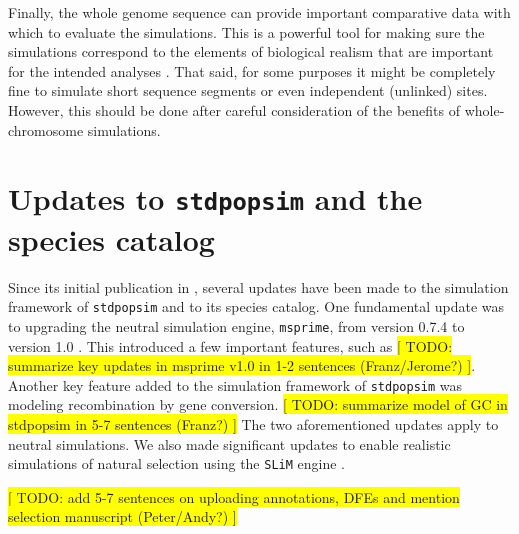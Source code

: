 \documentclass[hidelinks]{article}
\begin{document}
Finally, the whole genome sequence can provide important comparative
data with which to evaluate the simulations. This is a powerful tool for
making sure the simulations correspond to the elements of biological
realism that are important for the intended analyses \citep{Hsieh2016a}. 
%
That said, for some purposes it might be completely fine to simulate short sequence
segments or even independent (unlinked) sites. However, this should be done after
careful consideration  of the benefits of whole-chromosome simulations.


\hypertarget{sec3}{%
	\section*{Updates to \texttt{stdpopsim} and the species catalog}\label{sec:expanded-catalog}}

Since its initial publication in \cite{Adrion2020}, several updates have been made to  the simulation framework of \texttt{stdpopsim} and to its species catalog. One fundamental update was to upgrading the neutral simulation engine, \texttt{msprime}, from version 0.7.4 to version 1.0 \citep{Baumdicker2022}. This introduced a few important features, such as %
\colorbox{yellow}{[ TODO: summarize key updates in msprime v1.0 in 1-2 sentences (Franz/Jerome?) ]}.
%
Another key feature added to the simulation framework of \texttt{stdpopsim} was modeling recombination by gene conversion. %
\colorbox{yellow}{[ TODO: summarize model of GC in stdpopsim in 5-7 sentences (Franz?) ]}
%
The two aforementioned updates apply to neutral simulations. We also made significant updates to enable realistic simulations of natural selection using the \texttt{SLiM} engine \citep{Haller2019}. %

\colorbox{yellow}{[ TODO: add 5-7 sentences on uploading annotations, DFEs and mention selection manuscript (Peter/Andy?) ]}
%
\end{document}
